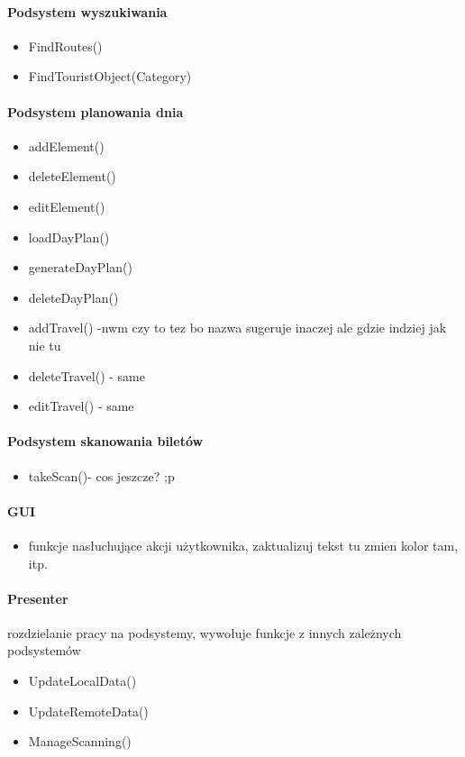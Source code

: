 \documentclass[10pt,twoside,a4paper]{report}
\begin{document}
\paragraph{Podsystem wyszukiwania}
\begin{itemize}
\item FindRoutes()
\item FindTouristObject(Category)
\end{itemize}

\paragraph{Podsystem planowania dnia}
\begin{itemize}
\item addElement()
\item deleteElement()
\item editElement()
\item loadDayPlan()
\item generateDayPlan()
\item deleteDayPlan()
\item addTravel() -nwm czy to tez bo nazwa sugeruje inaczej ale gdzie indziej jak nie tu
\item deleteTravel() - same
\item editTravel() - same
\end{itemize}

\paragraph{Podsystem skanowania biletów}
\begin{itemize}
\item takeScan()- cos jeszcze? ;p 
\end{itemize}


\paragraph{GUI}
\begin{itemize}
\item funkcje nasłuchujące akcji użytkownika, zaktualizuj tekst tu zmien kolor tam, itp.
\end{itemize}

\paragraph{Presenter}
rozdzielanie pracy na podsystemy, wywołuje funkcje z innych zależnych podsystemów
\begin{itemize}
\item UpdateLocalData()
\item UpdateRemoteData()
\item ManageScanning()
\end{itemize}
\end{document}
